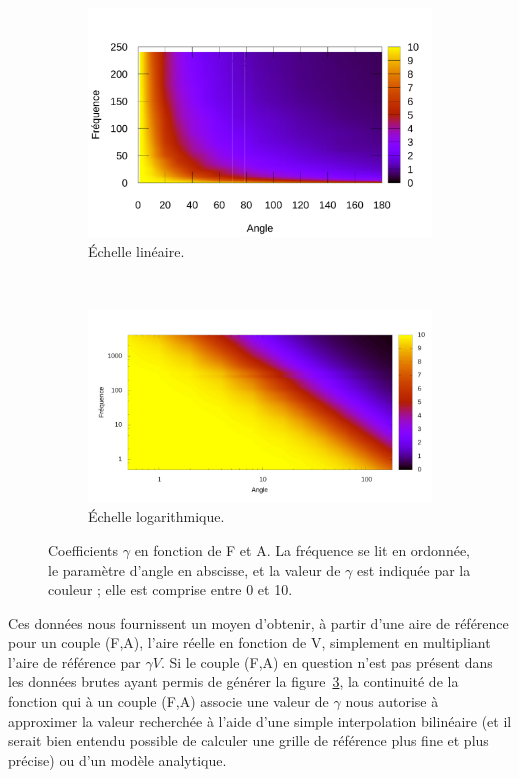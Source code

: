 	\begin{figure}[!htb]
		\centering
		\begin{subfigure}[t]{\textwidth}
			\centering
			\includegraphics[width=\textwidth]{figures/ch4/linApprox}
			\caption{Échelle linéaire.}
			\label{fig:gammaVfaLin}
		\end{subfigure}
		~
		\begin{subfigure}[t]{\textwidth}
			\centering
			\includegraphics[width=\textwidth]{figures/ch4/linApprox_log}
			\caption{Échelle logarithmique.}
			\label{fig:gammaVfaLog}
		\end{subfigure}
		\caption[Coefficients $\gamma$ en fonction de F et A]{Coefficients $\gamma$ en fonction de F et A. La fréquence se lit en ordonnée, le paramètre d'angle en abscisse, et la valeur de $\gamma$ est indiquée par la couleur ; elle est comprise entre 0 et 10.}
		\label{fig:gammaVfa}
	\end{figure}
	
	Ces données nous fournissent un moyen d'obtenir, à partir d'une aire de référence pour un couple (F,A), l'aire réelle en fonction de V, simplement en multipliant l'aire de référence par $\gamma{}V$. Si le couple (F,A) en question n'est pas présent dans les données brutes ayant permis de générer la figure~\ref{fig:gammaVfa}, la continuité de la fonction qui à un couple (F,A) associe une valeur de $\gamma$ nous autorise à approximer la valeur recherchée à l'aide d'une simple interpolation bilinéaire (et il serait bien entendu possible de calculer une grille de référence plus fine et plus précise) ou d'un modèle analytique.
	

